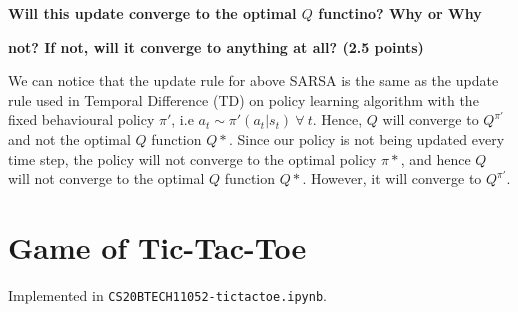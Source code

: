 \documentclass{article}
\begin{document}
\textbf{\quad Will this update converge to the optimal $Q$ functino? Why or
Why}

\textbf{\quad not? If not, will it converge to anything at all? (2.5 points)}

We can notice that the update rule for above SARSA is the same as the update rule used in Temporal Difference (TD) on policy learning algorithm with the fixed behavioural policy $\pi'$, i.e $a_t \sim \pi'(a_t|s_t)\ \forall\ t$. Hence, $Q$ will converge to $Q^{\pi'}$ and not the optimal $Q$ function $Q*$. Since our policy is not being updated every time step, the policy will not converge to the optimal policy $\pi*$, and hence $Q$ will not converge to the optimal $Q$ function $Q*$. However, it will converge to $Q^{\pi'}$.

\section{Game of Tic-Tac-Toe}
Implemented in \texttt{CS20BTECH11052-tictactoe.ipynb}.
\end{document}
